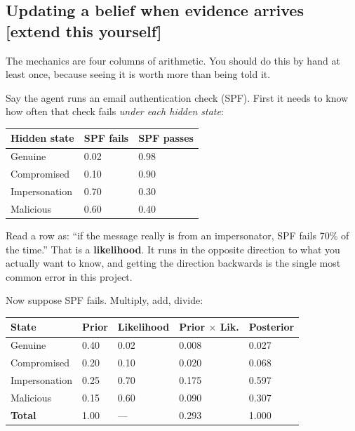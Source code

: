 \documentclass[11pt,a4paper]{article}
\newcommand{\keyword}[1]{\textbf{#1}}
\newcommand{\taught}{\hfill{\footnotesize\sffamily\color{sbaccent}[extend this yourself]}}
\begin{document}
\subsection{Updating a belief when evidence arrives \taught}

The mechanics are four columns of arithmetic. You should do this by hand at least once, because
seeing it is worth more than being told it.

Say the agent runs an email authentication check (SPF). First it needs to know how often that
check fails \emph{under each hidden state}:

\begin{center}
\begin{tabular}{@{}L{4.4cm}C{3cm}C{3cm}@{}}
\toprule
\textbf{Hidden state} & \textbf{SPF fails} & \textbf{SPF passes} \\
\midrule
Genuine       & 0.02 & 0.98 \\
Compromised   & 0.10 & 0.90 \\
Impersonation & 0.70 & 0.30 \\
Malicious     & 0.60 & 0.40 \\
\bottomrule
\end{tabular}
\end{center}

Read a row as: ``if the message really is from an impersonator, SPF fails 70\% of the time.''
That is a \keyword{likelihood}. It runs in the opposite direction to what you actually want to
know, and getting the direction backwards is the single most common error in this project.

Now suppose SPF fails. Multiply, add, divide:

\begin{center}
\begin{tabular}{@{}L{3.6cm}C{2.4cm}C{2.4cm}C{2.8cm}C{2.4cm}@{}}
\toprule
\textbf{State} & \textbf{Prior} & \textbf{Likelihood} & \textbf{Prior $\times$ Lik.} & \textbf{Posterior} \\
\midrule
Genuine       & 0.40 & 0.02 & 0.008 & 0.027 \\
Compromised   & 0.20 & 0.10 & 0.020 & 0.068 \\
Impersonation & 0.25 & 0.70 & 0.175 & 0.597 \\
Malicious     & 0.15 & 0.60 & 0.090 & 0.307 \\
\midrule
\textbf{Total} & 1.00 & --- & 0.293 & 1.000 \\
\bottomrule
\end{tabular}
\end{center}
\end{document}
